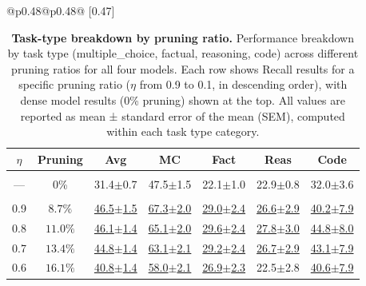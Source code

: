 \begin{table}[t]
\caption{\textbf{Task-type breakdown by pruning ratio.}
Performance breakdown by task type (multiple\_choice, factual, reasoning, code) across different pruning ratios for all four models.
Each row shows Recall results for a specific pruning ratio ($\eta$ from 0.9 to 0.1, in descending order), with dense model results (0\% pruning) shown at the top. All values are reported as mean ± standard error of the mean (SEM), computed within each task type category.}
\vspace{-2mm}
\footnotesize
\setlength{\tabcolsep}{2.5pt}
\renewcommand{\arraystretch}{1.05}
\centering
\begin{tabular}{@{}p{}@{}p{}@{}}
[0.47\textwidth]{
\begin{tabular}{c c c c c c c}
\toprule
\textbf{$\eta$} & \textbf{Pruning} & \textbf{Avg} & \textbf{MC} & \textbf{Fact} & \textbf{Reas} & \textbf{Code} \\
\midrule
\rowcolor{lightgray} \multicolumn{7}{c}{\rule{0pt}{2.2ex}\textbf{Dense Model}\rule[-0.8ex]{0pt}{0pt}} \\
\rowcolor{white} --- & 0\% & 31.4{\scriptsize$\pm$0.7} & 47.5{\scriptsize$\pm$1.5} & 22.1{\scriptsize$\pm$1.0} & 22.9{\scriptsize$\pm$0.8} & 32.0{\scriptsize$\pm$3.6} \\
\midrule
\rowcolor{lightgray} \multicolumn{7}{c}{\rule{0pt}{2.2ex}\textbf{SubspacePath Pruner}\rule[-0.8ex]{0pt}{0pt}} \\
\rowcolor{white} 0.9 & $8.7\%$ & \underline{46.5{\scriptsize$\pm$1.5}} & \underline{67.3{\scriptsize$\pm$2.0}} & \underline{29.0{\scriptsize$\pm$2.4}} & \underline{26.6{\scriptsize$\pm$2.9}} & \underline{40.2{\scriptsize$\pm$7.9}} \\
\rowcolor{white} 0.8 & $11.0\%$ & \underline{46.1{\scriptsize$\pm$1.4}} & \underline{65.1{\scriptsize$\pm$2.0}} & \underline{29.6{\scriptsize$\pm$2.4}} & \underline{27.8{\scriptsize$\pm$3.0}} & \underline{44.8{\scriptsize$\pm$8.0}} \\
\rowcolor{white} 0.7 & $13.4\%$ & \underline{44.8{\scriptsize$\pm$1.4}} & \underline{63.1{\scriptsize$\pm$2.1}} & \underline{29.2{\scriptsize$\pm$2.4}} & \underline{26.7{\scriptsize$\pm$2.9}} & \underline{43.1{\scriptsize$\pm$7.9}} \\
\rowcolor{white} 0.6 & $16.1\%$ & \underline{40.8{\scriptsize$\pm$1.4}} & \underline{58.0{\scriptsize$\pm$2.1}} & \underline{26.9{\scriptsize$\pm$2.3}} & 22.5{\scriptsize$\pm$2.8} & \underline{40.6{\scriptsize$\pm$7.9}} \\

\end{tabular}}
\end{tabular}
\end{table}
